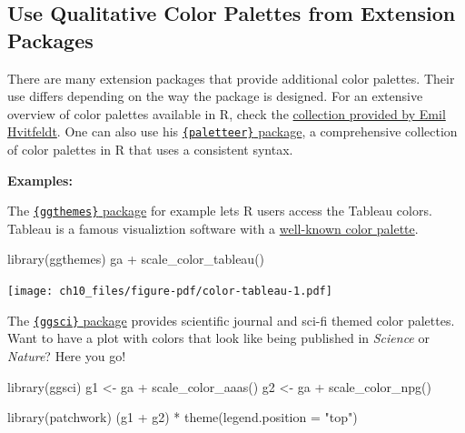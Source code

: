 \documentclass[
  letterpaper,
]{scrbook}
\newenvironment{Shaded}{\begin{snugshade}}{\end{snugshade}}
\newcommand{\AttributeTok}[1]{\textcolor[rgb]{0.40,0.45,0.13}{#1}}
\newcommand{\FunctionTok}[1]{\textcolor[rgb]{0.28,0.35,0.67}{#1}}
\newcommand{\NormalTok}[1]{\textcolor[rgb]{0.00,0.23,0.31}{#1}}
\newcommand{\OtherTok}[1]{\textcolor[rgb]{0.00,0.23,0.31}{#1}}
\newcommand{\SpecialCharTok}[1]{\textcolor[rgb]{0.37,0.37,0.37}{#1}}
\newcommand{\StringTok}[1]{\textcolor[rgb]{0.13,0.47,0.30}{#1}}
\begin{document}
\subsection{Use Qualitative Color Palettes from Extension
Packages}\label{use-qualitative-color-palettes-from-extension-packages}

There are many extension packages that provide additional color
palettes. Their use differs depending on the way the package is
designed. For an extensive overview of color palettes available in R,
check the
\href{https://github.com/EmilHvitfeldt/r-color-palettes/blob/master/README.md\#comprehensive-list-of-color-palettes-in-r}{collection
provided by Emil Hvitfeldt}. One can also use his
\href{https://github.com/EmilHvitfeldt/paletteer}{\texttt{\{paletteer\}}
package}, a comprehensive collection of color palettes in R that uses a
consistent syntax.

\textbf{Examples:}

The \href{https://jrnold.github.io/ggthemes/}{\texttt{\{ggthemes\}}
package} for example lets R users access the Tableau colors. Tableau is
a famous visualiztion software with a
\href{http://www.tableau.com/de-de/about/blog/2016/7/colors-upgrade-tableau-10-56782}{well-known
color palette}.

\begin{Shaded}
\begin{Highlighting}[]
\FunctionTok{library}\NormalTok{(ggthemes)}
\NormalTok{ga }\SpecialCharTok{+} \FunctionTok{scale\_color\_tableau}\NormalTok{()}
\end{Highlighting}
\end{Shaded}

\texttt{[image: ch10\_files/figure-pdf/color-tableau-1.pdf]}

The \href{https://nanx.me/ggsci/articles/ggsci.html}{\texttt{\{ggsci\}}
package} provides scientific journal and sci-fi themed color palettes.
Want to have a plot with colors that look like being published in
\emph{Science} or \emph{Nature}? Here you go!

\begin{Shaded}
\begin{Highlighting}[]
\FunctionTok{library}\NormalTok{(ggsci)}
\NormalTok{g1 }\OtherTok{\textless{}{-}}\NormalTok{ ga }\SpecialCharTok{+} \FunctionTok{scale\_color\_aaas}\NormalTok{()}
\NormalTok{g2 }\OtherTok{\textless{}{-}}\NormalTok{ ga }\SpecialCharTok{+} \FunctionTok{scale\_color\_npg}\NormalTok{()}

\FunctionTok{library}\NormalTok{(patchwork)}
\NormalTok{(g1 }\SpecialCharTok{+}\NormalTok{ g2) }\SpecialCharTok{*} \FunctionTok{theme}\NormalTok{(}\AttributeTok{legend.position =} \StringTok{"top"}\NormalTok{)}
\end{Highlighting}
\end{Shaded}
\end{document}
